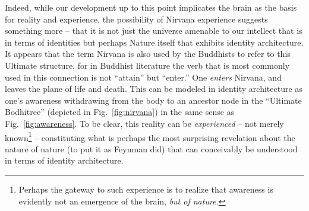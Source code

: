 \documentclass[pra,twocolumn,groupedaddress,10pt]{revtex4}
\theoremstyle{definition}
\begin{document}
Indeed, while our development up to this point implicates the brain as the basis for reality and experience, the possibility of Nirvana experience suggests something more -- that it is not just the universe amenable to our intellect that is in terms of identities but perhaps Nature itself that exhibits identity architecture. It appears that the term Nirvana is also used by the Buddhists to refer to this Ultimate structure, for in Buddhist literature the verb that is most commonly used in this connection is not ``attain'' but ``enter.'' One \textit{enters} Nirvana, and leaves the plane of life and death. This can be modeled in identity architecture as one's awareness withdrawing from the body to an ancestor node in the ``Ultimate Bodhitree'' (depicted in Fig.~\ref{fig:nirvana}) in the same sense as Fig.~\ref{fig:awareness}. To be clear, this reality can be \textit{experienced} -- not merely known\footnote{Perhaps the gateway to such experience is to realize that awareness is evidently not an emergence of the brain, \textit{but of nature.}} -- constituting what is perhaps the most surprising revelation about the nature of nature (to put it as Feynman did) that can conceivably be understood in terms of identity architecture.
\end{document}
